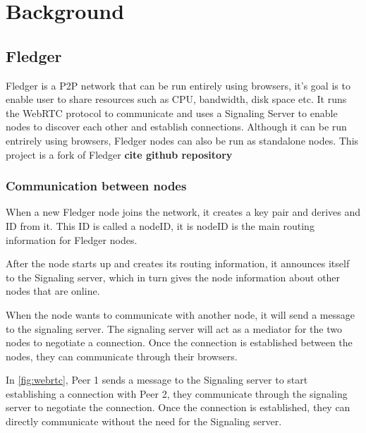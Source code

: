 \documentclass[a4paper,11pt,oneside]{report}
\begin{document}
\chapter{Background}



\section{Fledger}
\label{sec:fledger}
Fledger is a P2P network that can be run entirely using browsers, it's goal is to enable user to share resources such as CPU, bandwidth, disk space etc. It runs the WebRTC protocol to communicate and uses a Signaling Server to enable nodes to discover each other and establish connections. Although it can be run entrirely using browsers, Fledger nodes can also be run as standalone nodes. This project is a fork of Fledger \textbf{cite github repository}
\subsection{Communication between nodes}

When a new Fledger node joins the network, it creates a key pair and derives and ID from it. This ID is called a nodeID, it is nodeID is the main routing information for Fledger nodes. 

After the node starts up and creates its routing information, it announces itself to the Signaling server, which in turn gives the node information about other nodes that are online.

When the node wants to communicate with another node, it will send a message to the signaling server. The signaling server will act as a mediator for the two nodes to negotiate a connection. Once the connection is established between the nodes, they can communicate through their browsers.

In \autoref{fig:webrtc}, Peer 1 sends a message to the Signaling server to start establishing a connection with Peer 2, they communicate through the signaling server to negotiate the connection. Once the connection is established, they can directly communicate without the need for the Signaling server. 
\end{document}
